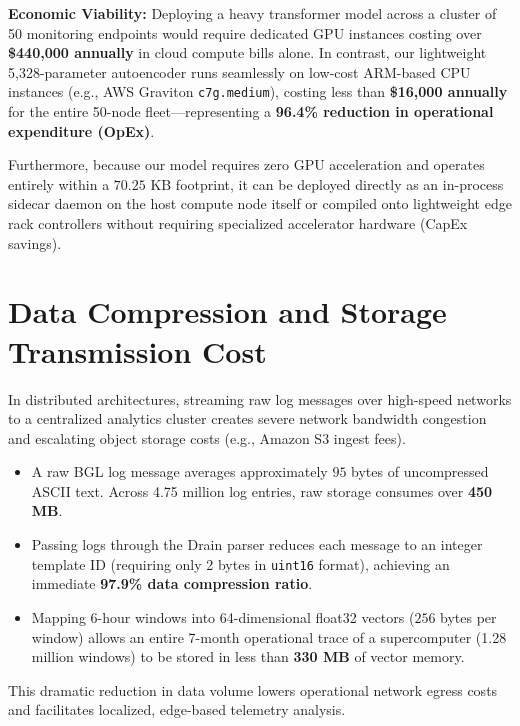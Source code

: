 \textbf{Economic Viability:} Deploying a heavy transformer model across a cluster of 50 monitoring endpoints would require dedicated GPU instances costing over \textbf{\$440,000 annually} in cloud compute bills alone. In contrast, our lightweight 5,328-parameter autoencoder runs seamlessly on low-cost ARM-based CPU instances (e.g., AWS Graviton \texttt{c7g.medium}), costing less than \textbf{\$16,000 annually} for the entire 50-node fleet—representing a \textbf{96.4\% reduction in operational expenditure (OpEx)}. 

Furthermore, because our model requires zero GPU acceleration and operates entirely within a $70.25\text{ KB}$ footprint, it can be deployed directly as an in-process sidecar daemon on the host compute node itself or compiled onto lightweight edge rack controllers without requiring specialized accelerator hardware (CapEx savings).

\section{Data Compression and Storage Transmission Cost}
\label{sec:cost_data_compression}
In distributed architectures, streaming raw log messages over high-speed networks to a centralized analytics cluster creates severe network bandwidth congestion and escalating object storage costs (e.g., Amazon S3 ingest fees). 
\begin{itemize}
    \item A raw BGL log message averages approximately $95$ bytes of uncompressed ASCII text. Across 4.75 million log entries, raw storage consumes over \textbf{450 MB}.
    \item Passing logs through the Drain parser reduces each message to an integer template ID (requiring only 2 bytes in \texttt{uint16} format), achieving an immediate \textbf{97.9\% data compression ratio}.
    \item Mapping 6-hour windows into 64-dimensional float32 vectors ($256$ bytes per window) allows an entire 7-month operational trace of a supercomputer (1.28 million windows) to be stored in less than \textbf{330 MB} of vector memory.
\end{itemize}
This dramatic reduction in data volume lowers operational network egress costs and facilitates localized, edge-based telemetry analysis.

